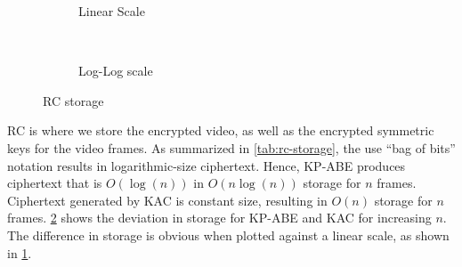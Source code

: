\documentclass[hyp,a4paper,12pt,openbib]{socreport}
\begin{document}
\begin{figure}
\centering
\begin{subfigure}[t]{0.5\textwidth}


\caption{Linear Scale}
\label{fig:rc-storage-linear}
\end{subfigure}~
\begin{subfigure}[t]{0.5\textwidth}

\caption{Log-Log scale}

\end{subfigure}
\caption{RC storage}
\label{fig:rc-storage}
\end{figure}

RC is where we store the encrypted video, as well as the encrypted symmetric keys for the video frames. As summarized in \cref{tab:rc-storage}, the use ``bag of bits'' notation results in logarithmic-size ciphertext. Hence, KP-ABE produces ciphertext that is $O(\log(n))$ in $O(n\log(n))$ storage for $n$ frames. Ciphertext generated by KAC is constant size, resulting in $O(n)$ storage for $n$ frames. \cref{fig:rc-storage} shows the deviation in storage for KP-ABE and KAC for increasing $n$. The difference in storage is obvious when plotted against a linear scale, as shown in \cref{fig:rc-storage-linear}.
\end{document}
